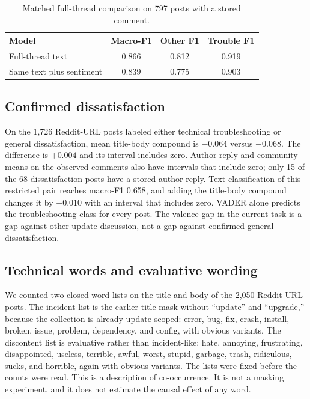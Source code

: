 \documentclass[conference,letterpaper]{IEEEtran}
\begin{document}
\begin{table}[t]
\caption{Matched full-thread comparison on 797 posts with a stored comment.}
\label{tab:thread}
\centering
\footnotesize
\begin{tabular}{lccc}
\toprule
Model & Macro-F1 & Other F1 & Trouble F1 \\
\midrule
Full-thread text & 0.866 & 0.812 & 0.919 \\
Same text plus sentiment & 0.839 & 0.775 & 0.903 \\
\bottomrule
\end{tabular}
\end{table}

\subsection{Confirmed dissatisfaction}
On the 1,726 Reddit-URL posts labeled either technical troubleshooting or general dissatisfaction, mean title-body compound is $-0.064$ versus $-0.068$. The difference is $+0.004$ and its interval includes zero. Author-reply and community means on the observed comments also have intervals that include zero; only 15 of the 68 dissatisfaction posts have a stored author reply. Text classification of this restricted pair reaches macro-F1 0.658, and adding the title-body compound changes it by $+0.010$ with an interval that includes zero. VADER alone predicts the troubleshooting class for every post. The valence gap in the current task is a gap against other update discussion, not a gap against confirmed general dissatisfaction.

\subsection{Technical words and evaluative wording}
We counted two closed word lists on the title and body of the 2,050 Reddit-URL posts. The incident list is the earlier title mask without ``update'' and ``upgrade,'' because the collection is already update-scoped: error, bug, fix, crash, install, broken, issue, problem, dependency, and config, with obvious variants. The discontent list is evaluative rather than incident-like: hate, annoying, frustrating, disappointed, useless, terrible, awful, worst, stupid, garbage, trash, ridiculous, sucks, and horrible, again with obvious variants. The lists were fixed before the counts were read. This is a description of co-occurrence. It is not a masking experiment, and it does not estimate the causal effect of any word.
\end{document}
